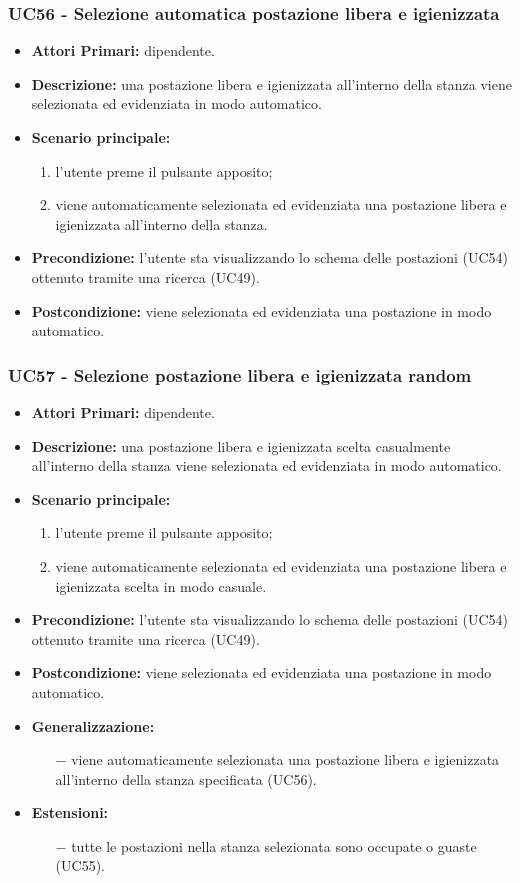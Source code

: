 \subsubsection{ UC56 - Selezione automatica postazione libera e igienizzata}
\begin{itemize}
	\item\textbf{Attori Primari:} dipendente.
	\item\textbf{Descrizione:} una postazione libera e igienizzata all'interno della stanza viene selezionata ed evidenziata	in modo automatico.
	\item\textbf{Scenario principale:}
	\begin{enumerate}
		\item l'utente preme il pulsante apposito;
		\item viene automaticamente selezionata ed evidenziata una postazione libera e igienizzata all'interno della stanza.
	\end{enumerate}
	\item\textbf{Precondizione:} l’utente sta visualizzando lo schema delle postazioni (UC54) ottenuto tramite una ricerca (UC49).
	\item\textbf{Postcondizione:} viene selezionata ed evidenziata una postazione in modo automatico.
\end{itemize}
\subsubsection{ UC57 - Selezione postazione libera e igienizzata random}
\begin{itemize}
	\item\textbf{Attori Primari:} dipendente.
	\item\textbf{Descrizione:} una postazione libera e igienizzata scelta casualmente all'interno della stanza viene selezionata ed evidenziata in modo automatico.
	\item\textbf{Scenario principale:}
	\begin{enumerate}
		\item l'utente preme il pulsante apposito;
		\item viene automaticamente selezionata ed evidenziata una postazione libera e igienizzata scelta in modo casuale.
	\end{enumerate}
	\item\textbf{Precondizione:} l’utente sta visualizzando lo schema delle postazioni (UC54) ottenuto tramite una ricerca (UC49).
	\item\textbf{Postcondizione:} viene selezionata ed evidenziata una postazione in modo automatico.
	\item\textbf{Generalizzazione:}
	\begin{itemize}
		\item[$-$] viene automaticamente selezionata una postazione libera e igienizzata all'interno della stanza specificata (UC56).
	\end{itemize}
	\item\textbf{Estensioni:}
	\begin{itemize}
		\item[$-$] tutte le postazioni nella stanza selezionata sono occupate o guaste (UC55).
	\end{itemize}
\end{itemize}
